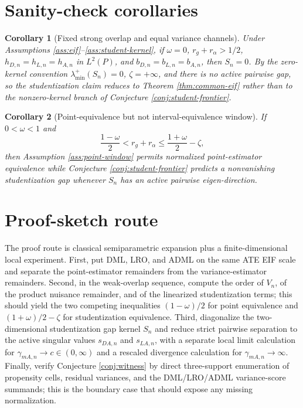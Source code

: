 \documentclass[11pt]{article}
\theoremstyle{definition}
\theoremstyle{plain}
\newtheorem{corollary}{Corollary}
\theoremstyle{remark}
\begin{document}
\section{Sanity-check corollaries}
\begin{corollary}[Fixed strong overlap and equal variance channels]\label{cor:fixed-overlap}
Under Assumptions \ref{ass:eif}--\ref{ass:student-kernel}, if
\(\omega=0\), \(r_g+r_\alpha>1/2\),
\(h_{D,n}=h_{L,n}=h_{A,n}\) in \(L^2(P)\), and
\(b_{D,n}=b_{L,n}=b_{A,n}\), then \(S_n=0\).  By the zero-kernel convention
\(\lambda_{\min}^+(S_n)=0\), \(\zeta=+\infty\), and there is no active pairwise
gap, so the studentization claim reduces to Theorem \ref{thm:common-eif}
rather than to the nonzero-kernel branch of Conjecture
\ref{conj:student-frontier}.
\end{corollary}

\begin{corollary}[Point-equivalence but not interval-equivalence window]\label{cor:window}
If \(0<\omega<1\) and
\[
  \frac{1-\omega}{2}<r_g+r_\alpha\le \frac{1+\omega}{2}-\zeta,
\]
then Assumption \ref{ass:point-window} permits normalized point-estimator
equivalence while Conjecture \ref{conj:student-frontier} predicts a
nonvanishing studentization gap whenever \(S_n\) has an active pairwise
eigen-direction.
\end{corollary}

\section{Proof-sketch route}
The proof route is classical semiparametric expansion plus a finite-dimensional
local experiment.  First, put DML, LRO, and ADML on the same ATE EIF scale and
separate the point-estimator remainders from the variance-estimator
remainders.  Second, in the weak-overlap sequence, compute the order of
\(V_n\), of the product nuisance remainder, and of the linearized
studentization terms; this should yield the two competing inequalities
\((1-\omega)/2\) for point equivalence and \((1+\omega)/2-\zeta\) for
studentization equivalence.  Third, diagonalize the two-dimensional
studentization gap kernel \(S_n\) and reduce strict pairwise separation to the
active singular values \(s_{DA,n}\) and \(s_{LA,n}\), with a separate local
limit calculation for \(\gamma_{mA,n}\to c\in(0,\infty)\) and a rescaled
divergence calculation for \(\gamma_{mA,n}\to\infty\).  Finally, verify
Conjecture \ref{conj:witness} by direct three-support enumeration of
propensity cells, residual variances, and the DML/LRO/ADML variance-score
summands; this is the boundary case that should expose any missing
normalization.
\end{document}
